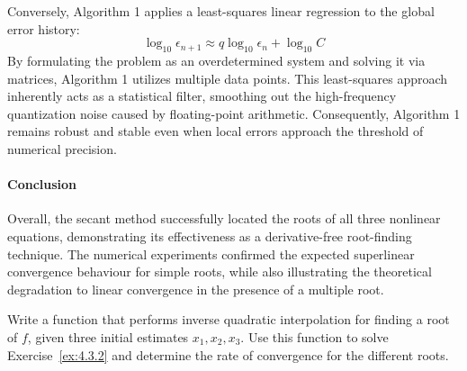 \begin{solution}
	Conversely, Algorithm 1 applies a least-squares linear regression to the
	global error history:
	\[
		\log_{10} \epsilon_{n+1} \approx q \log_{10} \epsilon_n + \log_{10} C
	\]
	By formulating the problem as an overdetermined system and solving it via
	matrices, Algorithm 1 utilizes multiple data points. This least-squares
	approach inherently acts as a statistical filter, smoothing out the
	high-frequency quantization noise caused by floating-point arithmetic.
	Consequently, Algorithm 1 remains robust and stable even when local errors
	approach the threshold of numerical precision.

	\paragraph{Conclusion}
	Overall, the secant method successfully located the roots of all three
	nonlinear equations, demonstrating its effectiveness as a derivative-free
	root-finding technique. The numerical experiments confirmed the expected
	superlinear convergence behaviour for simple roots, while also illustrating the
	theoretical degradation to linear convergence in the presence of a multiple
	root.

\end{solution}

\begin{exercise}
	Write a function that performs inverse quadratic interpolation for finding a
	root of $f$, given three initial estimates $x_1,x_2,x_3$. Use this function
	to solve Exercise~\ref{ex:4.3.2} and determine the rate of convergence for
	the different roots.
\end{exercise}

